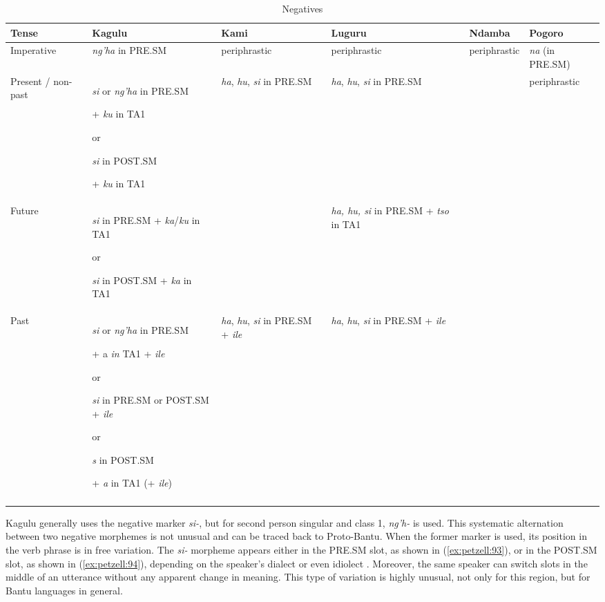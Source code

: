 \documentclass[output=paper,
            colorlinks, citecolor=brown
            ,draftmode
		  ]{langscibook}
\begin{document}
\begin{sidewaystable}


\begin{tabularx}{\textwidth}{Q>{\raggedright\arraybackslash}p{.3\textwidth}QQlQ}

\lsptoprule

{\bfseries Tense} & {\bfseries Kagulu} & {\bfseries Kami} & {\bfseries Luguru} & {\bfseries Ndamba} & {\bfseries Pogoro}\\
\midrule
Imperative & \textit{ng'ha} in PRE.SM & periphrastic & periphrastic & periphrastic & \textit{na} (in PRE.SM)\\
Present / non-past & \textit{si} or \textit{ng'ha} in PRE.SM

+ \textit{ku} in TA1

or

\textit{si} in POST.SM

+ \textit{ku} in TA1 & \textit{ha}, \textit{hu}, \textit{si} in PRE.SM & \textit{ha}, \textit{hu}, \textit{si} in PRE.SM &  & periphrastic\\
Future & \textit{si} in PRE.SM + \textit{ka}/\textit{ku} in TA1

or

\textit{si} in POST.SM + \textit{ka} in TA1 &  & \textit{ha, hu, si} in PRE.SM + \textit{tso} in TA1 &  & \\
Past & \textit{si} or \textit{ng'ha} in PRE.SM

+ a \textit{in} TA1 + \textit{ile}

or

\textit{si} in PRE.SM or POST.SM + \textit{ile}

or

\textit{s} in POST.SM

+ \textit{a} in TA1 (+ \textit{ile}) & \textit{ha}, \textit{hu}, \textit{si} in PRE.SM + \textit{ile} & \textit{ha}, \textit{hu}, \textit{si} in PRE.SM + \textit{ile} &  & \\
\lspbottomrule
\end{tabularx}

\caption{Negatives}
\label{tab:petzell:8}
\end{sidewaystable}

Kagulu generally uses the negative marker \textit{si-}, but for second person singular and class 1, \textit{ng'h-} is used. This systematic alternation between two negative morphemes is not unusual and can be traced back to Proto-Bantu. When the former marker is used, its position in the verb phrase is in free variation. The \textit{si-} morpheme appears either in the PRE.SM slot, as shown in  (\ref{ex:petzell:93}), or in the POST.SM slot, as shown in  (\ref{ex:petzell:94}), depending on the speaker's dialect or even idiolect \citep{Petzell2010}. Moreover, the same speaker can switch slots in the middle of an utterance without any apparent change in meaning. This type of variation is highly unusual, not only for this region, but for Bantu languages in general.
\end{document}
